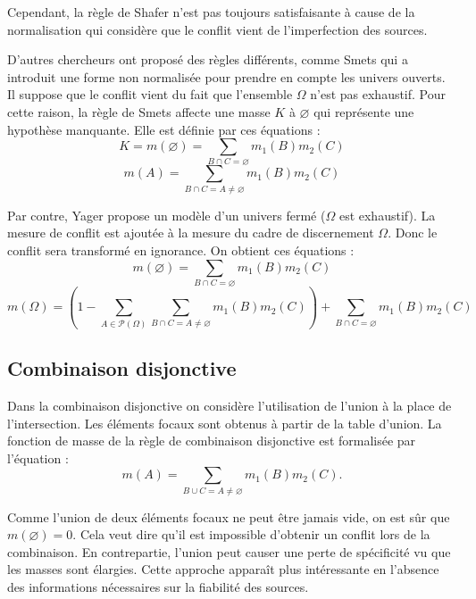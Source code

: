 Cependant, la règle de Shafer n’est pas toujours satisfaisante à cause de la
normalisation qui considère que le conflit vient de l’imperfection des sources.

D’autres chercheurs ont proposé des règles différents, comme Smets qui a introduit
une forme non normalisée pour prendre en compte les univers ouverts. Il suppose
que le conflit vient du fait que l’ensemble $\Omega$ n’est pas exhaustif. Pour
cette raison, la règle de Smets affecte une masse $K$ à $\varnothing$ qui représente
une hypothèse manquante. Elle est définie par ces équations :
\begin{equation}
K = m(\varnothing) = \sum_{B \cap C = \varnothing} m_1(B) m_2(C)
\end{equation}
\begin{equation}
m(A) = \sum_{B \cap C = A \neq \varnothing} m_1(B) m_2(C)
\end{equation}

Par contre, Yager propose un modèle d’un univers fermé ($\Omega$ est exhaustif).
La mesure de conflit est ajoutée à la mesure du cadre de discernement $\Omega$.
Donc le conflit sera transformé en ignorance. On obtient ces équations :
\begin{equation}
m(\varnothing) = \sum_{B \cap C = \varnothing} m_1(B) m_2(C)
\end{equation}
\begin{equation}
m(\Omega) = \left(1 - \sum_{A \in \mathcal{P}(\Omega)}
\sum_{B \cap C = A \neq \varnothing} m_1(B) m_2(C)\right) +
\sum_{B \cap C = \varnothing} m_1(B) m_2(C)
\end{equation}

\subsection{Combinaison disjonctive}

Dans la combinaison disjonctive on considère l’utilisation de l’union à la place
de l’intersection. Les éléments focaux sont obtenus à partir de la table d’union.
La fonction de masse de la règle de combinaison disjonctive est formalisée par l'équation :
\begin{equation}
m(A) = \sum_{B \cup C = A \neq \varnothing} m_1(B) m_2(C).
\end{equation}

Comme l’union de deux éléments focaux ne peut être jamais vide, on est sûr
que $m(\varnothing)=0$. Cela veut dire qu’il est impossible d’obtenir un conflit
lors de la combinaison. En contrepartie, l'union peut causer une perte de spécificité
vu que les masses sont élargies. Cette approche apparaît plus intéressante en
l’absence des informations nécessaires sur la fiabilité des sources.

